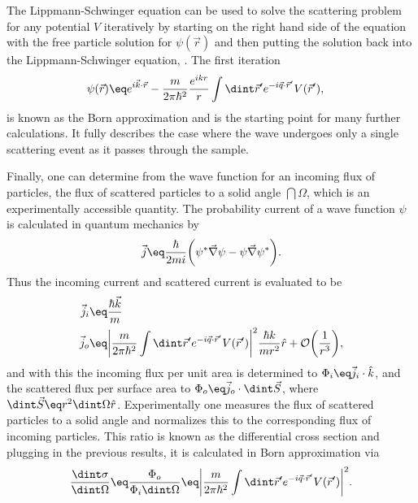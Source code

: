 \documentclass[\main/dresen_thesis.tex]{subfiles}
\begin{document}
The Lippmann-Schwinger equation can be used to solve the scattering problem for any potential $V$ iteratively by starting on the right hand side of the equation with the free particle solution for $\psi (\vec{r})$ and then putting the solution back into the Lippmann-Schwinger equation, \etc.
The first iteration 
\begin{align}
  \psi (\vec{r}) &\eq e^{i\vec{k} \cdot \vec{r}} - \frac{m}{2 \pi\hbar^2} \frac{e^{ikr}}{r} \int \dint \vec{r}^\prime e^{-i\vec{q} \cdot \vec{r}^\prime} V (\vec{r}^\prime),
  \label{eq:theoreticalBackground:scattering:scatteringTheory:firstBornApproximation}
\end{align}
is known as the Born approximation and is the starting point for many further calculations. It fully describes the case where the wave undergoes only a single scattering event as it passes through the sample. 

Finally, one can determine from the wave function for an incoming flux of particles, the flux of scattered particles to a solid angle $\dint \Omega$, which is an experimentally accessible quantity.  The probability current of a wave function $\psi$  is calculated in quantum mechanics by
\begin{align}
  \vec{j} \eq \frac{\hbar}{2mi} \bigg( \psi^* \vec{\nabla} \psi - \psi \vec{\nabla} \psi^* \bigg).
\end{align}
Thus the incoming current and scattered current is evaluated to be
\begin{align}
  \vec{j}_i &\eq \frac{\hbar \vec{k}}{m}\\
  \vec{j}_o &\eq \bigg| \frac{m}{2 \pi\hbar^2} \int \dint \vec{r}^\prime e^{-i\vec{q} \cdot \vec{r}^\prime} V (\vec{r}^\prime) \bigg|^2 \frac{\hbar k}{m r^2} \hat{r} + \mathcal{O} \bigg(\frac{1}{r^3}\bigg),\\
\end{align}
and with this the incoming flux per unit area is determined to $\Phi_i \eq \vec{j}_i \cdot \hat{k}$, and the scattered flux per surface area to $\Phi_o \eq \vec{j}_o \cdot \dint \vec{S}$, where $\dint \vec{S} \eq r^2 \dint \Omega \hat{r}$. 
Experimentally one measures the flux of scattered particles to a solid angle and normalizes this to the corresponding flux of incoming particles. This ratio is known as the differential cross section and plugging in the previous results, it is calculated in Born approximation via
\begin{align}
  \frac{\dint \sigma}{\dint \Omega} \eq \frac{\Phi_o}{\Phi_i \dint \Omega} \eq \bigg| \frac{m}{2 \pi\hbar^2} \int \dint \vec{r}^\prime e^{-i\vec{q} \cdot \vec{r}^\prime} V (\vec{r}^\prime) \bigg|^2.
  \label{eq:theoreticalBackground:scattering:scatteringTheory:differentialCrossSectionBornApproximation}
\end{align}
\end{document}
